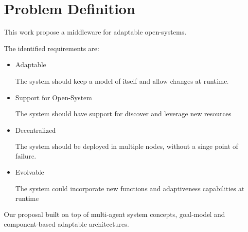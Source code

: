 \section{Problem Definition}




This work propose a middleware for adaptable open-systems.

The identified requirements are:
\begin{itemize}

 \item Adaptable

 The system should keep a model of itself and allow changes at runtime.

 \item Support for Open-System

 The system should have support for discover and leverage new resources

 \item Decentralized

 The system should be deployed in multiple nodes, without a singe point of failure.

 \item Evolvable

 The system could incorporate new functions and adaptiveness capabilities at runtime

\end{itemize}

Our proposal built on top of multi-agent system concepts, goal-model and component-based adaptable architectures.



\setlength{\fboxsep}{10pt}
\noindent{}\bigskip


\setlength{\fboxsep}{10pt}
\noindent{}\bigskip


\setlength{\fboxsep}{10pt}
\noindent{}\bigskip

